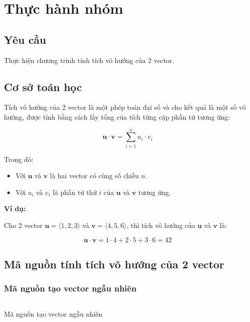 \newpage
\section{Thực hành nhóm}
\subsection{Yêu cầu}
Thực hiện chương trình tính tích vô hướng của 2 vector.
\subsection{Cơ sở toán học}
Tích vô hướng của 2 vector là một phép toán đại số và cho kết quả là một số vô hướng, được tính bằng cách lấy tổng của tích từng cặp phần tử tương ứng:

\[ \mathbf{u} \cdot \mathbf{v} = \sum_{i=1}^{n} u_i \cdot v_i \]

Trong đó:


\begin{itemize}
 \item Với \( \mathbf{u} \) và \( \mathbf{v} \) là hai vector có cùng số chiều \( n \).
 \item Với \( u_i \) và \( v_i \) là phần tử thứ \( i \) của \( \mathbf{u} \) và \( \mathbf{v} \) tương ứng.
\end{itemize}

\textbf{Ví dụ:}

Cho 2 vector \( \mathbf{u} = \langle 1, 2, 3 \rangle \) và \( \mathbf{v} = \langle 4, 5, 6 \rangle \), thì tích vô hướng của \( \mathbf{u} \) và \( \mathbf{v} \) là:

\[ \mathbf{u} \cdot \mathbf{v} = 1 \cdot 4 + 2 \cdot 5 + 3 \cdot 6 = 42\]






\subsection{Mã nguồn tính tích vô hướng của 2 vector}

\subsubsection{Mã nguồn tạo vector ngẫu nhiên}
\begin{listing}[H]
 \centering
 \inputminted{cpp}{sources/MaNguon2NN.cpp}
 \caption{Mã nguồn tạo vector ngẫu nhiên}
 \label{code:MaNguon2NN}
\end{listing}



